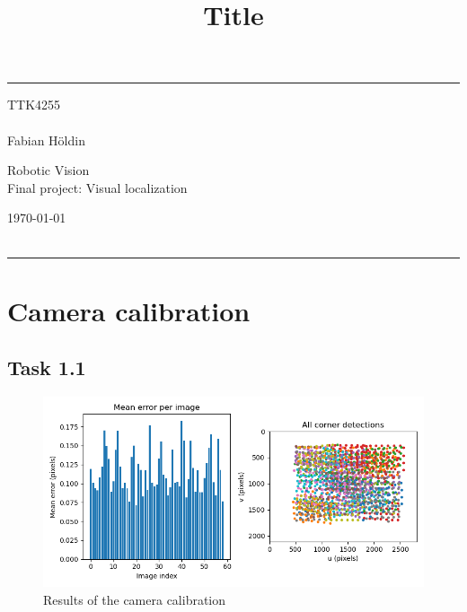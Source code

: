 \documentclass[a4paper]{article} %
\begin{document}

    \title{Title} %
    \fancyhead[C]{}
    \hrule \medskip %
    \begin{minipage}{0.295\textwidth} %
        \raggedright
        TTK4255\\ %
        \footnotesize %
        \hfill\\
        Fabian Höldin %
    \end{minipage}
    \begin{minipage}{0.4\textwidth} %
        \centering
        \large %
        Robotic Vision \\ %
        \normalsize %
        Final project: Visual localization\\ %
    \end{minipage}
    \begin{minipage}{0.295\textwidth} %
        \raggedleft
        \today\\ %
        \footnotesize %
        \hfill\\
    \end{minipage}
    \medskip\hrule %
    
\section{Camera calibration}

    \subsection*{Task 1.1}

    \begin{figure}[h]
        \center
        \includegraphics[width= \linewidth]{calibrationResult}
        \caption{Results of the camera calibration}
    \end{figure}
\end{document}
